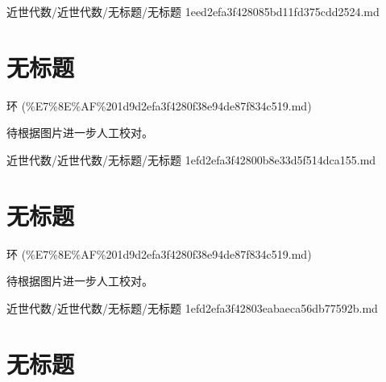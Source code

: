 \begin{note}[来源路径]

近世代数/近世代数/无标题/无标题 1eed2efa3f428085bd11fd375cdd2524.md

\end{note}

\section*{无标题}

\begin{note}[来源上级主题]

环 (\%E7\%8E\%AF\%201d9d2efa3f4280f38e94de87f834c519.md)

\end{note}

\begin{note}[无标题]

待根据图片进一步人工校对。

\end{note}

\begin{note}[来源路径]

近世代数/近世代数/无标题/无标题 1efd2efa3f42800b8e33d5f514dca155.md

\end{note}

\section*{无标题}

\begin{note}[来源上级主题]

环 (\%E7\%8E\%AF\%201d9d2efa3f4280f38e94de87f834c519.md)

\end{note}

\begin{note}[无标题]

待根据图片进一步人工校对。

\end{note}

\begin{note}[来源路径]

近世代数/近世代数/无标题/无标题 1efd2efa3f42803eabaeca56db77592b.md

\end{note}

\section*{无标题}

